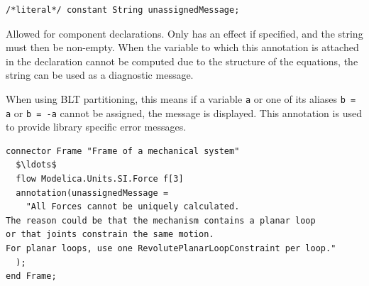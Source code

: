 \begin{annotationdefinition}[unassignedMessage]
\begin{synopsis}\begin{lstlisting}
/*literal*/ constant String unassignedMessage;
\end{lstlisting}\end{synopsis}
\begin{semantics}
Allowed for component declarations.
Only has an effect if specified, and the string must then be non-empty.
When the variable to which this annotation is attached in the declaration cannot be computed due to the structure of the equations, the string can be used as a diagnostic message.

\begin{nonnormative}
When using BLT partitioning, this means if a variable \lstinline!a! or one of its aliases \lstinline!b = a! or \lstinline!b = -a! cannot be assigned, the message is displayed.
This annotation is used to provide library specific error messages.
\end{nonnormative}

\begin{example}
\begin{lstlisting}[language=modelica]
connector Frame "Frame of a mechanical system"
  $\ldots$
  flow Modelica.Units.SI.Force f[3]
  annotation(unassignedMessage =
    "All Forces cannot be uniquely calculated.
The reason could be that the mechanism contains a planar loop
or that joints constrain the same motion.
For planar loops, use one RevolutePlanarLoopConstraint per loop."
  );
end Frame;
\end{lstlisting}
\end{example}
\end{semantics}
\end{annotationdefinition}

